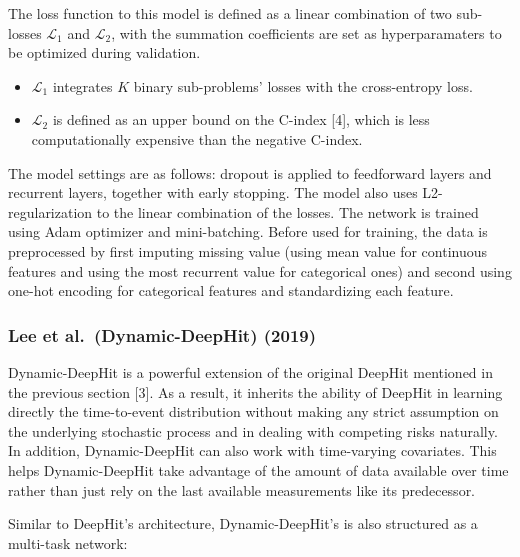 \documentclass[
]{article}
\providecommand{\tightlist}{%
  \setlength{\itemsep}{0pt}\setlength{\parskip}{0pt}}
\begin{document}
The loss function to this model is defined as a linear combination of two sub-losses \(\mathcal{L}_1\) and \(\mathcal{L}_2\), with the summation coefficients are set as hyperparamaters to be optimized during validation.
\vspace{-0.5cm}

\begin{itemize}
\tightlist
\item
  \(\mathcal{L}_1\) integrates \(K\) binary sub-problems' losses with the cross-entropy loss.
\item
  \(\mathcal{L}_2\) is defined as an upper bound on the C-index {[}4{]}, which is less computationally expensive than the negative C-index.
\end{itemize}

The model settings are as follows: dropout is applied to feedforward layers and recurrent layers, together with early stopping. The model also uses L2-regularization to the linear combination of the losses. The network is trained using Adam optimizer and mini-batching. Before used for training, the data is preprocessed by first imputing missing value (using mean value for continuous features and using the most recurrent value for categorical ones) and second using one-hot encoding for categorical features and standardizing each feature.

\hypertarget{lee-et-al.-dynamic-deephit-2019}{%
\subsubsection{Lee et al.~(Dynamic-DeepHit) (2019)}\label{lee-et-al.-dynamic-deephit-2019}}

Dynamic-DeepHit is a powerful extension of the original DeepHit mentioned in the previous section {[}3{]}. As a result, it inherits the ability of DeepHit in learning directly the time-to-event distribution without making any strict assumption on the underlying stochastic process and in dealing with competing risks naturally. In addition, Dynamic-DeepHit can also work with time-varying covariates. This helps Dynamic-DeepHit take advantage of the amount of data available over time rather than just rely on the last available measurements like its predecessor.

Similar to DeepHit's architecture, Dynamic-DeepHit's is also structured as a multi-task network:
\vspace{-0.45cm}
\end{document}
